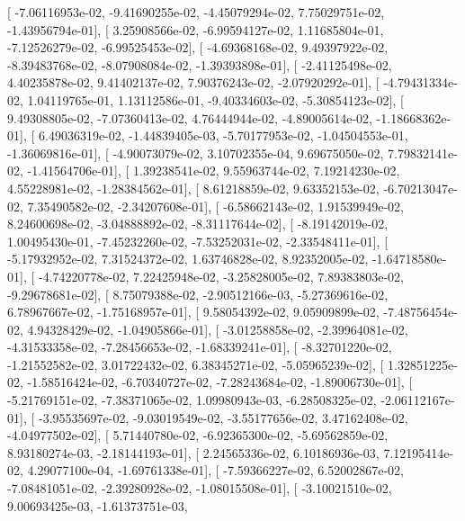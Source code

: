 \documentclass{article}
\begin{document}
       [ -7.06116953e-02,  -9.41690255e-02,  -4.45079294e-02,
          7.75029751e-02,  -1.43956794e-01],
       [  3.25908566e-02,  -6.99594127e-02,   1.11685804e-01,
         -7.12526279e-02,  -6.99525453e-02],
       [ -4.69368168e-02,   9.49397922e-02,  -8.39483768e-02,
         -8.07908084e-02,  -1.39393898e-01],
       [ -2.41125498e-02,   4.40235878e-02,   9.41402137e-02,
          7.90376243e-02,  -2.07920292e-01],
       [ -4.79431334e-02,   1.04119765e-01,   1.13112586e-01,
         -9.40334603e-02,  -5.30854123e-02],
       [  9.49308805e-02,  -7.07360413e-02,   4.76444944e-02,
         -4.89005614e-02,  -1.18668362e-01],
       [  6.49036319e-02,  -1.44839405e-03,  -5.70177953e-02,
         -1.04504553e-01,  -1.36069816e-01],
       [ -4.90073079e-02,   3.10702355e-04,   9.69675050e-02,
          7.79832141e-02,  -1.41564706e-01],
       [  1.39238541e-02,   9.55963744e-02,   7.19214230e-02,
          4.55228981e-02,  -1.28384562e-01],
       [  8.61218859e-02,   9.63352153e-02,  -6.70213047e-02,
          7.35490582e-02,  -2.34207608e-01],
       [ -6.58662143e-02,   1.91539949e-02,   8.24600698e-02,
         -3.04888892e-02,  -8.31117644e-02],
       [ -8.19142019e-02,   1.00495430e-01,  -7.45232260e-02,
         -7.53252031e-02,  -2.33548411e-01],
       [ -5.17932952e-02,   7.31524372e-02,   1.63746828e-02,
          8.92352005e-02,  -1.64718580e-01],
       [ -4.74220778e-02,   7.22425948e-02,  -3.25828005e-02,
          7.89383803e-02,  -9.29678681e-02],
       [  8.75079388e-02,  -2.90512166e-03,  -5.27369616e-02,
          6.78967667e-02,  -1.75168957e-01],
       [  9.58054392e-02,   9.05909899e-02,  -7.48756454e-02,
          4.94328429e-02,  -1.04905866e-01],
       [ -3.01258858e-02,  -2.39964081e-02,  -4.31533358e-02,
         -7.28456653e-02,  -1.68339241e-01],
       [ -8.32701220e-02,  -1.21552582e-02,   3.01722432e-02,
          6.38345271e-02,  -5.05965239e-02],
       [  1.32851225e-02,  -1.58516424e-02,  -6.70340727e-02,
         -7.28243684e-02,  -1.89006730e-01],
       [ -5.21769151e-02,  -7.38371065e-02,   1.09980943e-03,
         -6.28508325e-02,  -2.06112167e-01],
       [ -3.95535697e-02,  -9.03019549e-02,  -3.55177656e-02,
          3.47162408e-02,  -4.04977502e-02],
       [  5.71440780e-02,  -6.92365300e-02,  -5.69562859e-02,
          8.93180274e-03,  -2.18144193e-01],
       [  2.24565336e-02,   6.10186936e-03,   7.12195414e-02,
          4.29077100e-04,  -1.69761338e-01],
       [ -7.59366227e-02,   6.52002867e-02,  -7.08481051e-02,
         -2.39280928e-02,  -1.08015508e-01],
       [ -3.10021510e-02,   9.00693425e-03,  -1.61373751e-03,
\end{document}
